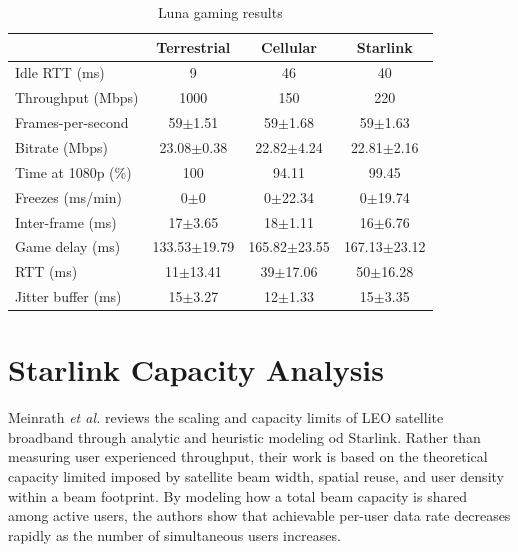 \FloatBarrier
\begin{table}[htbp]
\centering
\small
\caption{Luna gaming results}
\label{tab:luna_gaming}
\begin{tabular}{lccc}
\toprule
 & \textbf{Terrestrial} & \textbf{Cellular} & \textbf{Starlink} \\
\midrule
Idle RTT (ms)          & \cellcolor{gray!25}9            & 46              & 40              \\
Throughput (Mbps)     & \cellcolor{gray!25}1000         & 150             & 220             \\
Frames-per-second     & 59$\pm$1.51                     & 59$\pm$1.68     & \cellcolor{gray!25}59$\pm$1.63 \\
Bitrate (Mbps)        & 23.08$\pm$0.38                  & \cellcolor{gray!25}22.82$\pm$4.24 & 22.81$\pm$2.16 \\
Time at 1080p (\%)    & 100                             & \cellcolor{gray!25}94.11          & 99.45          \\
Freezes (ms/min)      & 0$\pm$0                         & \cellcolor{gray!25}0$\pm$22.34    & 0$\pm$19.74    \\
Inter-frame (ms)      & 17$\pm$3.65                     & 18$\pm$1.11     & \cellcolor{gray!25}16$\pm$6.76  \\
Game delay (ms)       & 133.53$\pm$19.79                & \cellcolor{gray!25}165.82$\pm$23.55 & 167.13$\pm$23.12 \\
RTT (ms)              & 11$\pm$13.41                    & \cellcolor{gray!25}39$\pm$17.06  & 50$\pm$16.28  \\
Jitter buffer (ms)    & 15$\pm$3.27                     & 12$\pm$1.33     & \cellcolor{gray!25}15$\pm$3.35 \\
\bottomrule
\end{tabular}
\end{table}
\FloatBarrier


\section{Starlink Capacity Analysis}
Meinrath \textit{et al.} \cite{XLabStarlink2025} reviews the scaling and capacity limits of LEO satellite broadband through analytic and heuristic modeling od Starlink. Rather than measuring user experienced throughput, their work is based on the theoretical capacity limited imposed by satellite beam width, spatial reuse, and user density within a beam footprint. By modeling how a total beam capacity is shared among active users, the authors show that achievable per-user data rate decreases rapidly as the number of simultaneous users increases. 

